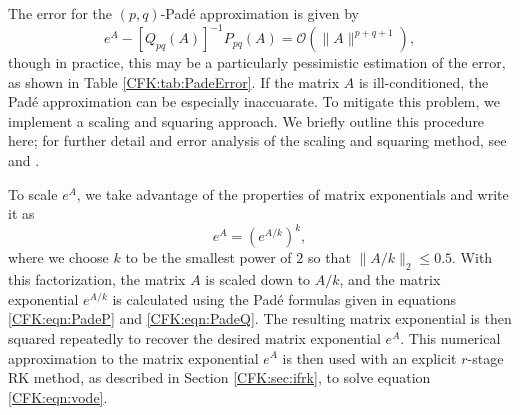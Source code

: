 \documentclass{csri19}
\begin{document}
The error for the $(p,q)$-Pad\'e approximation is given by
\[e^A-\left[Q_{pq}(A)\right]^{-1}P_{pq}(A) = \mathcal{O}(\|A\|^{p+q+1}),\] 
though in practice, this may be a particularly pessimistic estimation of 
the error, as shown in Table \ref{CFK:tab:PadeError}. If the matrix $A$ is 
ill-conditioned, the Pad\'e  approximation can be especially inaccuarate. 
To mitigate this problem, we implement a scaling and squaring approach. We 
briefly outline this procedure here; for further detail and error analysis 
of the scaling and squaring method, see \cite{CFK:Al-Mohy2009} and 
\cite{CFK:higham2005}.


To scale $e^A$, we take advantage of the properties of matrix exponentials 
and write it as
\[e^{A} = \left(e^{A/k}\right)^k,\]
where we choose $k$ to be the smallest power of $2$ so that $\|A/k\|_2
\leq 0.5$. With this factorization, the matrix $A$ is scaled down to $A/k$, 
and the matrix exponential $e^{A/k}$ is calculated using the Pad\'e 
formulas given in equations \ref{CFK:eqn:PadeP} and \ref{CFK:eqn:PadeQ}. 
The resulting matrix exponential is then squared repeatedly to recover the 
desired matrix exponential $e^{A}$. This numerical approximation to the 
matrix exponential $e^A$ is then used with an explicit $r$-stage RK method, 
as described in Section \ref{CFK:sec:ifrk}, to solve equation 
\ref{CFK:eqn:vode}.
\end{document}
